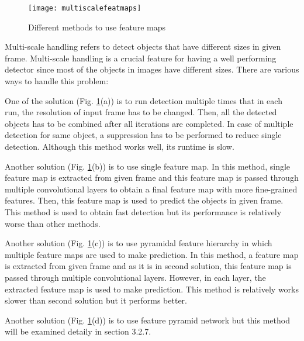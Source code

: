 \documentclass{article}
\begin{document}
\setlength{\parindent}{6ex}

\begin{figure}
    \centering
    \texttt{[image: multiscalefeatmaps]}
    \caption{Different methods to use feature maps}
    \label{fig:multiscalefeatmaps1}
\end{figure}

\indent

Multi-scale handling refers to detect objects that have different 
sizes in given frame. Multi-scale handling is a crucial feature for 
having a well performing detector since most of the objects in images
have different sizes. There are various ways to handle this problem: \par

One of the solution (Fig. \ref{fig:multiscalefeatmaps1}(a)) is to run detection multiple times that in each 
run, the resolution of input frame has to be changed. Then, all the 
detected objects has to be combined after all iterations are completed. 
In case of multiple detection for same object, a suppression has to be 
performed to reduce single detection. Although this method works well, 
its runtime is slow. \par

Another solution (Fig. \ref{fig:multiscalefeatmaps1}(b)) is to use single feature map. In this method, single 
feature map is extracted from given frame and this feature map is passed 
through multiple convolutional layers to obtain a final feature map with 
more fine-grained features. Then, this feature map is used to predict the 
objects in given frame. This method is used to obtain fast detection but 
its performance is relatively worse than other methods. \par

Another solution (Fig. \ref{fig:multiscalefeatmaps1}(c)) is to use pyramidal feature hierarchy in which multiple 
feature maps are used to make prediction. In this method, a feature map 
is extracted from given frame and as it is in second solution, this 
feature map is passed through multiple convolutional layers. However, 
in each layer, the extracted feature map is used to make prediction. This 
method is relatively works slower than second solution but it performs better. \par

Another solution (Fig. \ref{fig:multiscalefeatmaps1}(d)) is to use feature pyramid network but this method will be 
examined detaily in section 3.2.7. 
\end{document}
